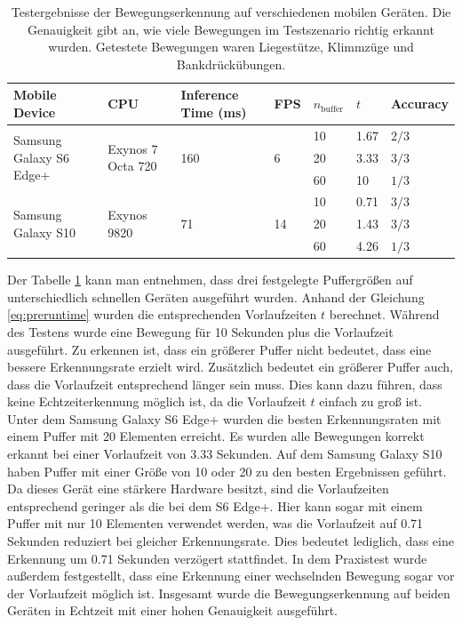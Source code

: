 \begin{table}
    \footnotesize
    \begin{tabularx}{\textwidth}{l|l|X|l|l|l|l}
        \hline
        Mobile Device & CPU & Inference Time (ms) & FPS & $n_\mathrm{buffer}$ & $t$ & Accuracy \\ \hline

        \multirow{3}{*}{Samsung Galaxy S6 Edge+} & \multirow{3}{*}{Exynos 7 Octa 720} & \multirow{3}{*}{160} & \multirow{3}{*}{6} & 10 & 1.67 & $2 / 3$ \\ \cline{5-7}
        & & & & 20 & 3.33 & $3 / 3$ \\ \cline{5-7}
        & & & & 60 & 10 & $1 / 3$ \\ \hline

        \multirow{3}{*}{Samsung Galaxy S10} & \multirow{3}{*}{Exynos 9820} & \multirow{3}{*}{71} & \multirow{3}{*}{14} & 10 & 0.71 & $3/3$  \\ \cline{5-7}
        & & & & 20 & 1.43 & $3/3$ \\ \cline{5-7}
        & & & & 60 & 4.26 & $1/3$ \\ \hline
    \end{tabularx}
    \caption{Testergebnisse der Bewegungserkennung auf verschiedenen mobilen Geräten. Die Genauigkeit gibt an, wie viele Bewegungen im Testszenario richtig erkannt wurden. Getestete Bewegungen waren Liegestütze, Klimmzüge und Bankdrückübungen.}
    \label{table:android-tests}
\end{table}

Der Tabelle \ref{table:android-tests} kann man entnehmen, dass drei festgelegte
Puffergrößen auf unterschiedlich schnellen Geräten ausgeführt wurden. Anhand
der Gleichung \ref{eq:preruntime} wurden die entsprechenden Vorlaufzeiten
$t$ berechnet. Während des Testens wurde eine Bewegung für 10 Sekunden plus die
Vorlaufzeit ausgeführt. Zu erkennen ist, dass ein größerer Puffer nicht
bedeutet, dass eine bessere Erkennungsrate erzielt wird. Zusätzlich bedeutet
ein größerer Puffer auch, dass die Vorlaufzeit entsprechend länger sein muss.
Dies kann dazu führen, dass keine Echtzeiterkennung möglich ist, da die
Vorlaufzeit $t$ einfach zu groß ist. Unter dem Samsung Galaxy S6 Edge+ wurden
die besten Erkennungsraten mit einem Puffer mit 20 Elementen erreicht. Es
wurden alle Bewegungen korrekt erkannt bei einer Vorlaufzeit von 3.33 Sekunden.
Auf dem Samsung Galaxy S10 haben Puffer mit einer Größe von 10 oder 20 zu den
besten Ergebnissen geführt. Da dieses Gerät eine stärkere Hardware besitzt,
sind die Vorlaufzeiten entsprechend geringer als die bei dem S6 Edge+. Hier
kann sogar mit einem Puffer mit nur 10 Elementen verwendet werden, was die
Vorlaufzeit auf 0.71 Sekunden reduziert bei gleicher Erkennungsrate. Dies bedeutet
lediglich, dass eine Erkennung um 0.71 Sekunden verzögert stattfindet. In dem
Praxistest wurde außerdem festgestellt, dass eine Erkennung einer wechselnden
Bewegung sogar vor der Vorlaufzeit möglich ist.  Insgesamt wurde die
Bewegungserkennung auf beiden Geräten in Echtzeit mit einer hohen Genauigkeit
ausgeführt.
